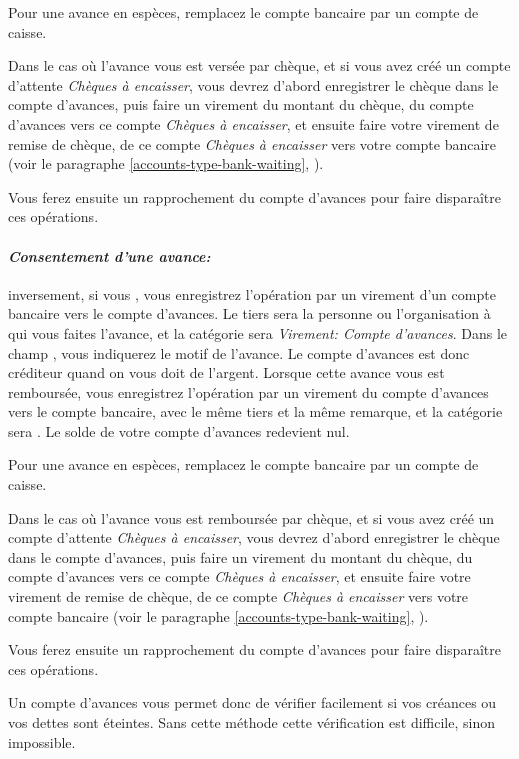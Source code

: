 Pour une avance en espèces, remplacez le compte bancaire par un compte de caisse.

Dans le cas où l'avance vous est versée par chèque, et si vous avez créé un compte d'attente \emph{Chèques à encaisser}, vous devrez d'abord enregistrer le chèque dans le compte d'avances, puis faire un virement du montant du chèque, du compte d'avances vers ce compte \emph{Chèques à encaisser}, et ensuite faire votre virement de remise de chèque, de ce compte \emph{Chèques à encaisser} vers votre compte bancaire (voir le paragraphe \vref{accounts-type-bank-waiting}, ). 

Vous ferez ensuite un rapprochement du compte d'avances pour faire disparaître ces opérations.

\paragraph{\textsl{Consentement d'une avance:}} inversement, si vous , vous enregistrez l'opération par un virement d'un compte bancaire vers le compte d'avances. Le tiers sera la personne ou l'organisation à qui vous faites l'avance, et la catégorie sera \emph{Virement: Compte d'avances}. Dans le champ , vous indiquerez le motif de l'avance. Le compte d'avances est donc créditeur quand on vous doit de l'argent. Lorsque cette avance vous est remboursée, vous enregistrez l'opération par un virement du compte d'avances vers le compte bancaire, avec le même tiers et la même remarque, et la catégorie sera . Le solde de votre compte d'avances redevient nul.

Pour une avance en espèces, remplacez le compte bancaire par un compte de caisse.

Dans le cas où l'avance vous est remboursée par chèque, et si vous avez créé un compte d'attente \emph{Chèques à encaisser}, vous devrez d'abord enregistrer le chèque dans le compte d'avances, puis faire un virement du montant du chèque, du compte d'avances vers ce compte \emph{Chèques à encaisser}, et ensuite faire votre virement de remise de chèque, de ce compte \emph{Chèques à encaisser} vers votre compte bancaire (voir le paragraphe \vref{accounts-type-bank-waiting}, ). 

Vous ferez ensuite un rapprochement du compte d'avances pour faire disparaître ces opérations.

Un compte d'avances vous permet donc de vérifier facilement si vos créances ou vos dettes sont éteintes. Sans cette méthode cette vérification est difficile, sinon impossible.

